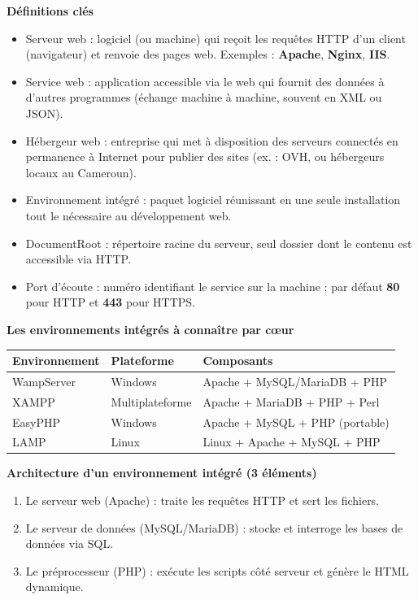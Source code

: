 \documentclass[11pt]{article}
\newcommand{\cle}[1]{{\popxbold\color{popdark}#1}}
\begin{document}
\begin{bilan}
\textbf{Définitions clés}
\begin{itemize}
  \item \cle{Serveur web} : logiciel (ou machine) qui reçoit les requêtes \cle{HTTP} d'un client (navigateur) et renvoie des pages web. Exemples : \textbf{Apache}, \textbf{Nginx}, \textbf{IIS}.
  \item \cle{Service web} : application accessible via le web qui fournit des données à d'autres programmes (échange machine à machine, souvent en XML ou JSON).
  \item \cle{Hébergeur web} : entreprise qui met à disposition des serveurs connectés en permanence à Internet pour publier des sites (ex. : OVH, ou hébergeurs locaux au Cameroun).
  \item \cle{Environnement intégré} : paquet logiciel réunissant en une seule installation tout le nécessaire au développement web.
  \item \cle{DocumentRoot} : répertoire racine du serveur, seul dossier dont le contenu est accessible via HTTP.
  \item \cle{Port d'écoute} : numéro identifiant le service sur la machine ; par défaut \textbf{80} pour HTTP et \textbf{443} pour HTTPS.
\end{itemize}

\textbf{Les environnements intégrés à connaître par c\oe ur}
\begin{center}
\begin{tabularx}{\linewidth}{|l|l|X|}
\hline
\rowcolor{popblueL} \textbf{Environnement} & \textbf{Plateforme} & \textbf{Composants} \\
\hline
WampServer & Windows & Apache + MySQL/MariaDB + PHP \\
\hline
XAMPP & Multiplateforme & Apache + MariaDB + PHP + Perl \\
\hline
EasyPHP & Windows & Apache + MySQL + PHP (portable) \\
\hline
LAMP & Linux & Linux + Apache + MySQL + PHP \\
\hline
\end{tabularx}
\end{center}

\textbf{Architecture d'un environnement intégré (3 éléments)}
\begin{enumerate}
  \item Le \cle{serveur web} (Apache) : traite les requêtes HTTP et sert les fichiers.
  \item Le \cle{serveur de données} (MySQL/MariaDB) : stocke et interroge les bases de données via SQL.
  \item Le \cle{préprocesseur} (PHP) : exécute les scripts côté serveur et génère le HTML dynamique.
\end{enumerate}


\end{bilan}
\end{document}
